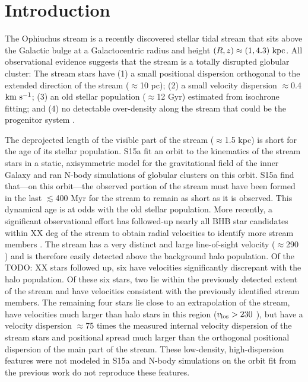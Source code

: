 \documentclass[letterpaper,12pt,preprint]{aastex}
\newcommand{\todo}[1]{{\color{red} TODO: #1}}
\begin{document}

\section{Introduction}\label{sec:introduction}

The Ophiuchus stream \citep{bernard14, sesar15} is a recently discovered stellar tidal stream that sits above the Galactic bulge at a Galactocentric radius and height $(R,z) \approx (1, 4.3)~{\rm kpc}$. All observational evidence suggests that the stream is a totally disrupted globular cluster: The stream stars have (1) a small positional dispersion orthogonal to the extended direction of the stream ($\approx$10 pc); (2) a small velocity dispersion $\approx$0.4 ${\rm km}~{\rm s}^{-1}$; (3) an old stellar population ($\approx$12 Gyr) estimated from isochrone fitting; and (4) no detectable over-density along the stream that could be  the progenitor system \citep[][hereafter S15a]{sesar15}. 

The deprojected length of the visible part of the stream ($\approx$1.5 kpc) is short for the age of its stellar population. S15a fit an orbit to the kinematics of the stream stars in a static, axisymmetric model for the gravitational field of the inner Galaxy and ran N-body simulations of globular clusters on this orbit. S15a find that---on this orbit---the observed portion of the stream must have been formed in the last $\lesssim$400 Myr for the stream to remain as short as it is observed. This dynamical age is at odds with the old stellar population. More recently, a significant observational effort has followed-up nearly all BHB star candidates within XX deg of the stream to obtain radial velocities to identify more stream members \citep{sesar15b}. The stream has a very distinct and large line-of-sight velocity ($\approx$290 \kms) and is therefore easily detected above the background halo population. Of the \todo{XX} stars followed up, six have velocities significantly discrepant with the halo population. Of these six stars, two lie within the previously detected extent of the stream and have velocities consistent with the previously identified stream members. The remaining four stars lie close to an extrapolation of the stream, have velocities much larger than halo stars in this region ($v_{\rm los}>230$ \kms), but have a velocity dispersion $\approx$75 times the measured internal velocity dispersion of the stream stars and positional spread much larger than the orthogonal positional dispersion of the main part of the stream. These low-density, high-dispersion features were not modeled in S15a and N-body simulations on the orbit fit from the previous work do not  reproduce these features.
\end{document}
